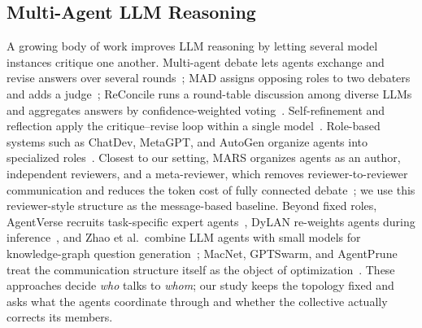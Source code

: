 \subsection{Multi-Agent LLM Reasoning}
A growing body of work improves LLM reasoning by letting several model instances critique one another.
Multi-agent debate lets agents exchange and revise answers over several rounds~\cite{du2024improving}; MAD assigns opposing roles to two debaters and adds a judge~\cite{liang2024mad}; ReConcile runs a round-table discussion among diverse LLMs and aggregates answers by confidence-weighted voting~\cite{chen2024reconcile}.
Self-refinement and reflection apply the critique--revise loop within a single model~\cite{madaan2023selfrefine,shinn2023reflexion}.
Role-based systems such as ChatDev, MetaGPT, and AutoGen organize agents into specialized roles~\cite{qian2024chatdev,hong2024metagpt,wu2024autogen}.
Closest to our setting, MARS organizes agents as an author, independent reviewers, and a meta-reviewer, which removes reviewer-to-reviewer communication and reduces the token cost of fully connected debate~\cite{wang2025mars}; we use this reviewer-style structure as the message-based baseline.
Beyond fixed roles, AgentVerse recruits task-specific expert agents~\cite{chen2024agentverse}, DyLAN re-weights agents during inference~\cite{liu2024dylan}, and Zhao et al.\ combine LLM agents with small models for knowledge-graph question generation~\cite{zhao2024kgqg}; MacNet, GPTSwarm, and AgentPrune treat the communication structure itself as the object of optimization~\cite{qian2025scaling,zhuge2024gptswarm,zhang2025agentprune}.
These approaches decide \emph{who} talks to \emph{whom}; our study keeps the topology fixed and asks what the agents coordinate through and whether the collective actually corrects its members.

